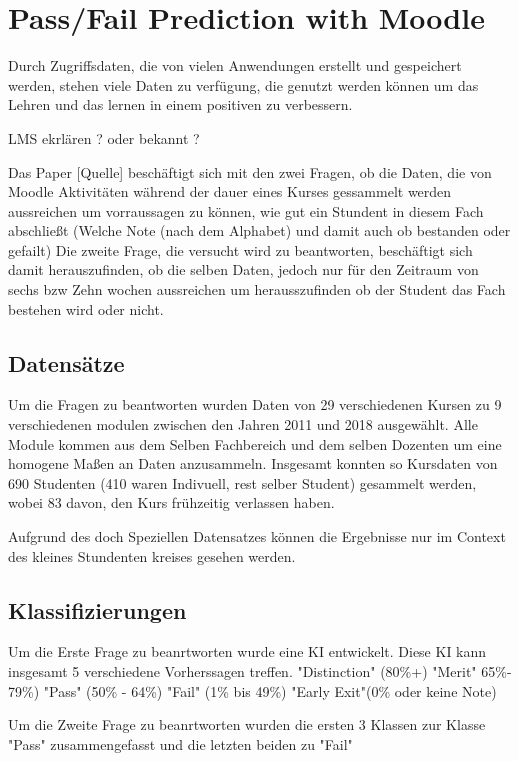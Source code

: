 \chapter{Pass/Fail Prediction with Moodle}


Durch Zugriffsdaten, die von vielen Anwendungen erstellt und gespeichert werden, stehen viele Daten zu verfügung,
die genutzt werden können um das Lehren und das lernen in einem positiven zu verbessern.

LMS ekrlären ? oder bekannt ?

Das Paper [Quelle] beschäftigt sich mit den zwei Fragen, ob die Daten, die von Moodle Aktivitäten während
der dauer eines Kurses gessammelt werden aussreichen um vorraussagen zu können, wie gut ein Stundent in diesem Fach abschließt (Welche Note (nach dem Alphabet) und damit auch ob bestanden oder gefailt)
Die zweite Frage, die versucht wird zu beantworten, beschäftigt sich damit herauszufinden, ob die selben Daten, jedoch 
nur für den Zeitraum von sechs bzw Zehn wochen aussreichen um herausszufinden ob der Student das Fach bestehen wird oder nicht.

\section*{Datensätze}
Um die Fragen zu beantworten wurden Daten von 29 verschiedenen Kursen zu 9 verschiedenen modulen zwischen den Jahren 2011 und 2018 ausgewählt.
Alle Module kommen aus dem Selben Fachbereich und dem selben Dozenten um eine homogene Maßen an Daten anzusammeln.
Insgesamt konnten so Kursdaten von 690 Studenten (410 waren Indivuell, rest selber Student) gesammelt werden, wobei 83 davon, den Kurs frühzeitig verlassen haben.

Aufgrund des doch Speziellen Datensatzes können die Ergebnisse nur im Context des kleines Stundenten kreises gesehen werden.



\section{Klassifizierungen}
Um die Erste Frage zu beanrtworten wurde eine KI entwickelt. Diese KI kann insgesamt 5 verschiedene Vorherssagen treffen.
"Distinction" (80\%+)
"Merit" 65\%- 79\%)
"Pass" (50\% - 64\%)
"Fail" (1\% bis 49\%)
"Early Exit"(0\% oder keine Note)

Um die Zweite Frage zu beanrtworten wurden die ersten 3 Klassen zur Klasse "Pass" zusammengefasst und die letzten beiden zu "Fail"

